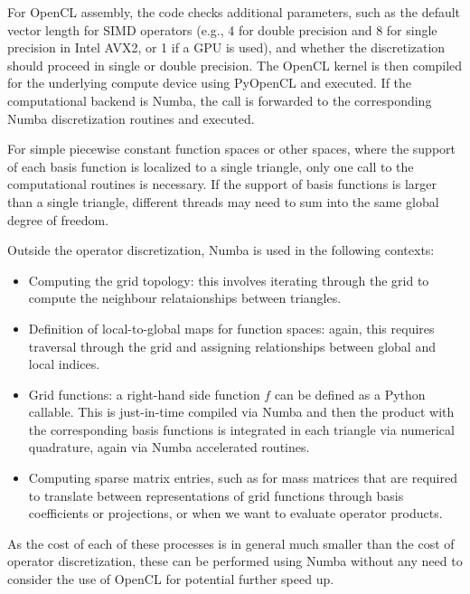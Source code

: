 For OpenCL assembly, the code checks additional parameters, such as the default vector length for SIMD operators (e.g., 4 for double precision and 8 for single precision in Intel AVX2, or 1 if a GPU is used), and whether the discretization should proceed in single or double precision. The OpenCL kernel is then compiled for the underlying compute device using PyOpenCL and executed. If the computational backend is Numba, the call is forwarded to the corresponding Numba discretization routines and executed.

For simple piecewise constant function spaces or other spaces, where the support of each basis function is localized to a single triangle, only one call to the computational routines is necessary. If the support of basis functions is larger than a single triangle, different threads may need to sum into the same global degree of freedom.

Outside the operator discretization, Numba is used in the following contexts:
\begin{itemize}
  \item Computing the grid topology: this involves iterating through the grid to compute the neighbour relataionships between triangles.
  \item Definition of local-to-global maps for function spaces: again, this requires traversal through the grid and assigning relationships between global and local indices.
  \item Grid functions: a right-hand side function $f$ can be defined as a Python callable. This is just-in-time compiled via Numba and then the product with the corresponding basis functions is integrated in each triangle via numerical quadrature, again via Numba accelerated routines.
  \item Computing sparse matrix entries, such as for mass matrices that are required to translate between representations of grid functions through basis coefficients or projections, or when we want to evaluate operator products.
\end{itemize}

As the cost of each of these processes is in general much smaller than the cost of operator discretization, these can be performed using Numba without any need to consider the use of OpenCL for potential further speed up.
